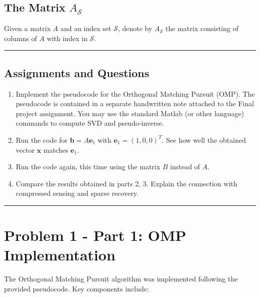 \subsection*{The Matrix $A_\mathcal{S}$}

Given a matrix $A$ and an index set $\mathcal{S}$, denote by $A_\mathcal{S}$ the matrix consisting of columns of $A$ with index in $\mathcal{S}$.

\noindent\rule{\textwidth}{0.4pt}

\vspace{1em}

\subsection*{Assignments and Questions}

\begin{enumerate}
\item Implement the pseudocode for the Orthogonal Matching Pursuit (OMP). The pseudocode is contained in a separate handwritten note attached to the Final project assignment. You may use the standard Matlab (or other language) commands to compute SVD and pseudo-inverse.

\item Run the code for $\mathbf{b} = A\mathbf{e}_1$ with $\mathbf{e}_1 = (1, 0, 0)^T$. See how well the obtained vector $\mathbf{x}$ matches $\mathbf{e}_1$.

\item Run the code again, this time using the matrix $B$ instead of $A$.

\item Compare the results obtained in parts 2, 3. Explain the connection with compressed sensing and sparse recovery.
\end{enumerate}

\vspace{1em}

\noindent\rule{\textwidth}{0.4pt}

\clearpage
\section*{Problem 1 - Part 1: OMP Implementation}

The Orthogonal Matching Pursuit algorithm was implemented following the provided pseudocode. Key components include:

